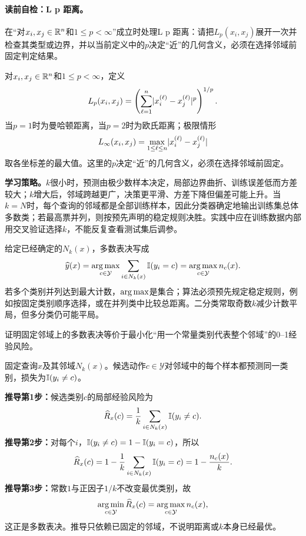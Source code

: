 \label{struct:V2-C02-CH07}
\paragraph{读前自检：L p 距离。}在“对$x_i,x_j\in\mathbb{R}^n$和$1\le p<\infty$”成立时处理L p 距离：请把$L_p(x_i,x_j)$展开一次并检查其类型或边界，并以当前定义中的$p$决定“近”的几何含义，必须在选择邻域前固定判定结果。\par

\begin{definition}[$L_p$距离]\label{def:V2-C02-lp}
对$x_i,x_j\in\mathbb{R}^n$和$1\le p<\infty$，定义
\[
L_p(x_i,x_j)=\left(\sum_{\ell=1}^{n}\lvert x_i^{(\ell)}-x_j^{(\ell)}\rvert^p\right)^{1/p}.
\]
当$p=1$时为曼哈顿距离，当$p=2$时为欧氏距离；极限情形
\[
L_\infty(x_i,x_j)=\max_{1\le\ell\le n}\lvert x_i^{(\ell)}-x_j^{(\ell)}\rvert
\]
取各坐标差的最大值。这里的$p$决定“近”的几何含义，必须在选择邻域前固定。
\end{definition}

\label{struct:V2-C02-CH09}
\textbf{学习策略。}$k$很小时，预测由极少数样本决定，局部边界曲折、训练误差低而方差较大；$k$增大后，邻域跨越更广，决策更平滑、方差下降但偏差可能上升。当$k=N$时，每个查询的邻域都是全部训练样本，因此分类器确定地输出训练集总体多数类；若最高票并列，则按预先声明的稳定规则决胜。实践中应在训练数据内部用交叉验证选择$k$，不能反复查看测试集后调参。

给定已经确定的$N_k(x)$，多数表决写成
\[
\widehat y(x)=\operatorname*{arg\,max}_{c\in\mathcal Y}
\sum_{i\in N_k(x)}\mathbb{I}(y_i=c)
=\operatorname*{arg\,max}_{c\in\mathcal Y}n_c(x).
\]
若多个类别并列达到最大计数，$\operatorname*{arg\,max}$是集合；算法必须预先规定稳定规则，例如按固定类别顺序选择，或在并列类中比较总距离。二分类常取奇数$k$减少计数平局，但多分类仍可能平局。

\label{struct:V2-C02-CH11}

\begin{derivationgoalbox}
证明固定邻域上的多数表决等价于最小化“用一个常量类别代表整个邻域”的0--1经验风险。
\end{derivationgoalbox}
\begin{derivationprepbox}
固定查询$x$及其邻域$N_k(x)$。候选动作$c\in\mathcal Y$对邻域中的每个样本都预测同一类别，损失为$\mathbb{I}(y_i\ne c)$。
\end{derivationprepbox}
\textbf{推导第1步：}候选类别$c$的局部经验风险为
\[
\widehat R_x(c)=\frac1k\sum_{i\in N_k(x)}\mathbb{I}(y_i\ne c).
\]
\textbf{推导第2步：}对每个$i$，$\mathbb{I}(y_i\ne c)=1-\mathbb{I}(y_i=c)$，所以
\[
\widehat R_x(c)=1-\frac1k\sum_{i\in N_k(x)}\mathbb{I}(y_i=c)
=1-\frac{n_c(x)}{k}.
\]
\textbf{推导第3步：}常数$1$与正因子$1/k$不改变最优类别，故
\[
\operatorname*{arg\,min}_{c\in\mathcal Y}\widehat R_x(c)
=\operatorname*{arg\,max}_{c\in\mathcal Y}n_c(x),
\]
这正是多数表决。推导只依赖已固定的邻域，不说明距离或$k$本身已经最优。

